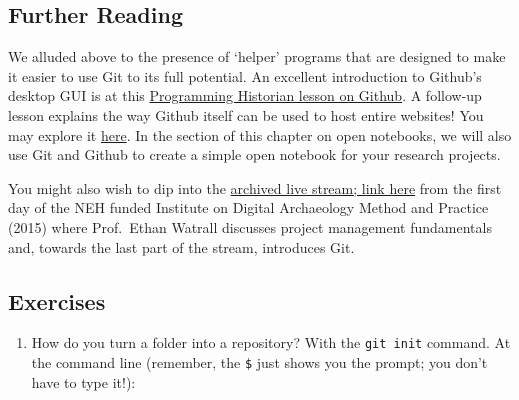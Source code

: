 \documentclass[english,]{book}
\providecommand{\tightlist}{%
  \setlength{\itemsep}{0pt}\setlength{\parskip}{0pt}}
\begin{document}
\subsection{Further Reading}\label{further-reading}

We alluded above to the presence of `helper' programs that are designed
to make it easier to use Git to its full potential. An excellent
introduction to Github's desktop GUI is at this
\href{http://programminghistorian.org/lessons/getting-started-with-github-desktop}{Programming
Historian lesson on Github}. A follow-up lesson explains the way Github
itself can be used to host entire websites! You may explore it
\href{http://programminghistorian.org/lessons/building-static-sites-with-jekyll-github-pages}{here}.
In the section of this chapter on open notebooks, we will also use Git
and Github to create a simple open notebook for your research projects.

You might also wish to dip into the
\href{https://www.youtube.com/watch?v=D0_j04BnVeA}{archived live stream;
link here} from the first day of the NEH funded Institute on Digital
Archaeology Method and Practice (2015) where Prof.~Ethan Watrall
discusses project management fundamentals and, towards the last part of
the stream, introduces Git.

\subsection{Exercises}\label{exercises-2}

\begin{enumerate}
\def\labelenumi{\arabic{enumi}.}
\tightlist
\item
  How do you turn a folder into a repository? With the
  \texttt{git\ init} command. At the command line (remember, the
  \texttt{\$} just shows you the prompt; you don't have to type it!):
\end{enumerate}
\end{document}
